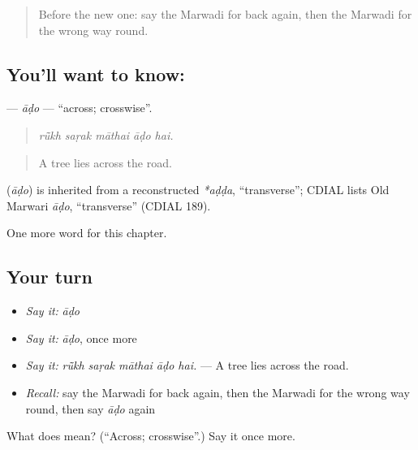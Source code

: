 \begin{quote}
Before the new one: say the Marwadi for back again, then the Marwadi for the wrong way round.
\end{quote}

\subsection*{You'll want to know: }
\textbf{} — \emph{āḍo} — \textquotedblleft{}across; crosswise\textquotedblright{}.

\begin{quote}
    
\end{quote}

\begin{quote}
\emph{rū̃kh saṛak māthai āḍo hai.}
\end{quote}

\begin{quote}
A tree lies across the road.
\end{quote}

\begin{cousinweb}
\textbf{} (\emph{āḍo}) is inherited from a reconstructed \emph{*aḍḍa}, \textquotedblleft{}transverse\textquotedblright{}; CDIAL lists Old Marwari \emph{āḍo}, \textquotedblleft{}transverse\textquotedblright{} (CDIAL 189).
\end{cousinweb}

\begin{grammarlens}[title={What you've built}]
One more word for this chapter.
\end{grammarlens}

\subsection*{Your turn}
\begin{itemize}
\raggedright
  \item \emph{Say it:} \emph{āḍo}
  \item \emph{Say it:} \emph{āḍo}, once more
  \item \emph{Say it:} \emph{rū̃kh saṛak māthai āḍo hai.} — A tree lies across the road.
  \item \emph{Recall:} say the Marwadi for back again, then the Marwadi for the wrong way round, then say \emph{āḍo} again
\end{itemize}

\begin{tcolorbox}[breakable,colback=teal!4,colframe=teal!35!black,title={Before you move on}]
What does  mean? (\textquotedblleft{}Across; crosswise\textquotedblright{}.) Say it once more.
\end{tcolorbox}
